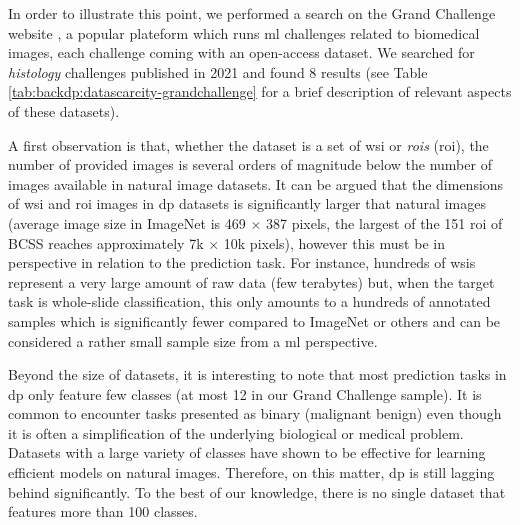 In order to illustrate this point, we performed a search on the Grand Challenge website \parencite{grandchallenge}, a popular plateform which runs \acrlong{ml} challenges related to biomedical images, each challenge coming with an open-access dataset. We searched for \textit{histology} challenges published in 2021 and found 8 results (see Table \ref{tab:backdp:datascarcity-grandchallenge} for a brief description of relevant aspects of these datasets).

A first observation is that, whether the dataset is a set of \acrshort{wsi} or \textit{\acrlong{roi}s} (\acrshort{roi}), the number of provided images is several orders of magnitude below the number of images available in natural image datasets. It can be argued that the dimensions of \acrshort{wsi} and \acrshort{roi} images in \acrlong{dp} datasets is significantly larger that natural images (\eg average image size in ImageNet is 469 $\times$ 387 pixels, the largest of the 151 \acrshort{roi} of BCSS reaches approximately 7k $\times$ 10k pixels), however this must be in perspective in relation to the prediction task. For instance, hundreds of \acrshort{wsi}s represent a very large amount of raw data (\eg few terabytes) but, when the target task is whole-slide classification, this only amounts to a hundreds of annotated samples which is significantly fewer compared to ImageNet or others and can be considered a rather small sample size from a \acrshort{ml} perspective.  

Beyond the size of datasets, it is interesting to note that most prediction tasks in \acrlong{dp} only feature few classes (at most 12 in our Grand Challenge sample). It is common to encounter tasks presented as binary (\eg malignant \vs benign) even though it is often a simplification of the underlying biological or medical problem. Datasets with a large variety of classes have shown to be effective for learning efficient models on natural images. Therefore, on this matter, \acrlong{dp} is still lagging behind significantly. To the best of our knowledge, there is no single dataset that features more than 100 classes. 

